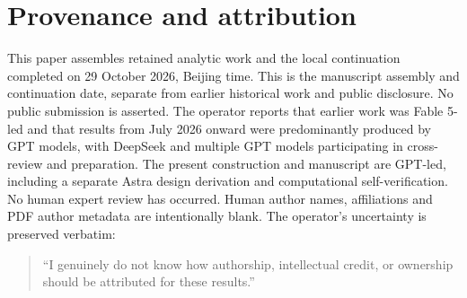 \documentclass[11pt]{article}
\begin{document}
\section*{Provenance and attribution}

This paper assembles retained analytic work and the local continuation completed on 29 October 2026, Beijing time.
This is the manuscript assembly and continuation date, separate from earlier historical work and public disclosure.
No public submission is asserted.
The operator reports that earlier work was Fable 5-led and that results from July 2026 onward were predominantly produced by GPT models, with DeepSeek and multiple GPT models participating in cross-review and preparation.
The present construction and manuscript are GPT-led, including a separate Astra design derivation and computational self-verification.
No human expert review has occurred.
Human author names, affiliations and PDF author metadata are intentionally blank.
The operator's uncertainty is preserved verbatim:
\begin{quote}
``I genuinely do not know how authorship, intellectual credit, or ownership should be attributed for these results.''
\end{quote}



\end{document}
